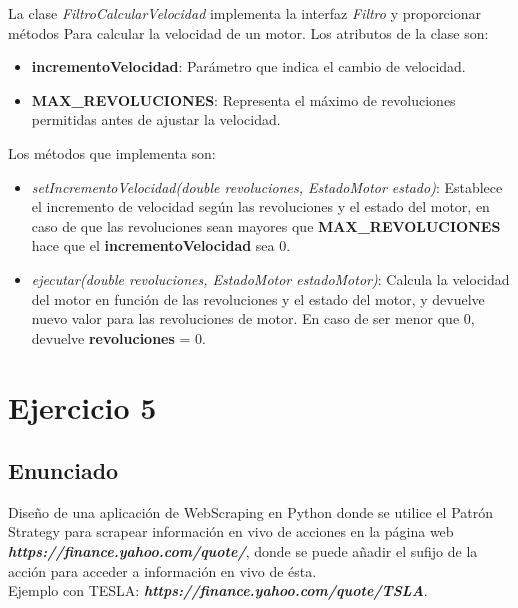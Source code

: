 \documentclass{article} %
\begin{document}
    \hspace*{1cm}La clase \textit{FiltroCalcularVelocidad} implementa la interfaz \textit{Filtro} y proporcionar métodos Para
    calcular la velocidad de un motor.
    Los atributos de la clase son:

    \begin{itemize}
        \item \textbf{incrementoVelocidad}: Parámetro que indica el cambio de velocidad.
        \item \textbf{MAX\_REVOLUCIONES}: Representa el máximo de revoluciones permitidas antes de ajustar la velocidad.
    \end{itemize}

    Los métodos que implementa son:

    \begin{itemize}
        \item \textit{setIncrementoVelocidad(double revoluciones, EstadoMotor estado)}: Establece el incremento de velocidad según las
                revoluciones y el estado del motor, en caso de que las revoluciones sean mayores que \textbf{MAX\_REVOLUCIONES} hace que
                el \textbf{incrementoVelocidad} sea 0.
        \item \textit{ejecutar(double revoluciones, EstadoMotor estadoMotor)}: Calcula la velocidad del motor en función de las revoluciones
                y el estado del motor, y devuelve nuevo valor para las revoluciones de motor. En caso de ser menor que 0, devuelve \textbf{revoluciones} = 0.
    \end{itemize}

    \section{Ejercicio 5}
    \subsection{Enunciado}
    \hspace*{1cm}Diseño de una aplicación de WebScraping en Python donde se utilice el Patrón Strategy
    para scrapear información en vivo de acciones en la página web \textit{\textbf{https://finance.yahoo.com/quote/}}, 
    donde se puede añadir el sufijo de la acción para acceder a información en vivo de ésta. \\
    Ejemplo con TESLA: \textit{\textbf{https://finance.yahoo.com/quote/TSLA}}.
    
\end{document}
